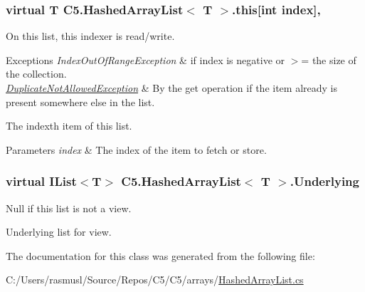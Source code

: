 \subsubsection[{this[int index]}]{\setlength{\rightskip}{0pt plus 5cm}virtual T {\bf C5.\+Hashed\+Array\+List}$<$ T $>$.this\mbox{[}int index\mbox{]}\hspace{0.3cm}{\ttfamily [get]}, {\ttfamily [set]}}\label{class_c5_1_1_hashed_array_list_a7122ca8cf35c8a9ec72facf36d2fb360}


On this list, this indexer is read/write. 


\begin{DoxyExceptions}{Exceptions}
{\em Index\+Out\+Of\+Range\+Exception} & if index is negative or $>$= the size of the collection.\\
\hline
{\em \hyperlink{class_c5_1_1_duplicate_not_allowed_exception}{Duplicate\+Not\+Allowed\+Exception}} & By the get operation if the item already is present somewhere else in the list.\\
\hline
\end{DoxyExceptions}


The index\textquotesingle{}th item of this list.


\begin{DoxyParams}{Parameters}
{\em index} & The index of the item to fetch or store.\\
\hline
\end{DoxyParams}
\hypertarget{class_c5_1_1_hashed_array_list_aa8039fdbfaa6caa1b0f2b4364a43e292}{}
\subsubsection[{Underlying}]{\setlength{\rightskip}{0pt plus 5cm}virtual {\bf I\+List}$<$T$>$ {\bf C5.\+Hashed\+Array\+List}$<$ T $>$.Underlying\hspace{0.3cm}{\ttfamily [get]}}\label{class_c5_1_1_hashed_array_list_aa8039fdbfaa6caa1b0f2b4364a43e292}


Null if this list is not a view. 

Underlying list for view.

The documentation for this class was generated from the following file\+:\begin{DoxyCompactItemize}
\item 
C\+:/\+Users/rasmusl/\+Source/\+Repos/\+C5/\+C5/arrays/\hyperlink{_hashed_array_list_8cs}{Hashed\+Array\+List.\+cs}\end{DoxyCompactItemize}
